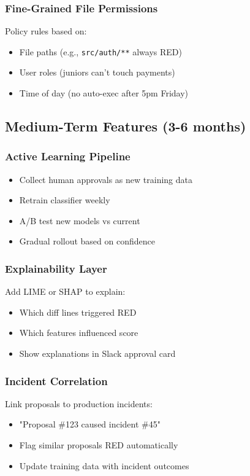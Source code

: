 \documentclass[11pt,a4paper]{article}
\begin{document}
\subsubsection{Fine-Grained File Permissions}
Policy rules based on:
\begin{itemize}
    \item File paths (e.g., \texttt{src/auth/**} always RED)
    \item User roles (juniors can't touch payments)
    \item Time of day (no auto-exec after 5pm Friday)
\end{itemize}

\subsection{Medium-Term Features (3-6 months)}

\subsubsection{Active Learning Pipeline}
\begin{itemize}
    \item Collect human approvals as new training data
    \item Retrain classifier weekly
    \item A/B test new models vs current
    \item Gradual rollout based on confidence
\end{itemize}

\subsubsection{Explainability Layer}
Add LIME or SHAP to explain:
\begin{itemize}
    \item Which diff lines triggered RED
    \item Which features influenced score
    \item Show explanations in Slack approval card
\end{itemize}

\subsubsection{Incident Correlation}
Link proposals to production incidents:
\begin{itemize}
    \item "Proposal \#123 caused incident \#45"
    \item Flag similar proposals RED automatically
    \item Update training data with incident outcomes
\end{itemize}
\end{document}
